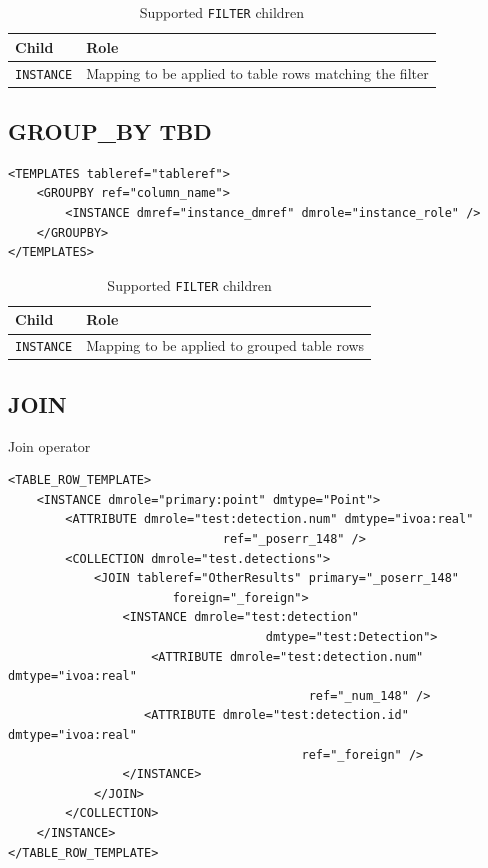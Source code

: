 \documentclass[11pt,a4paper]{ivoa}
\begin{document}
\begin{table}[!htbp]
     \begin{tabular}{|p{4cm}|p{9cm}|}
       \hline Child &  Role\\
       \hline  \texttt{INSTANCE}    & Mapping to be applied to table rows matching the filter \\       
       \hline 
     \end{tabular}
     \caption{Supported  \texttt{FILTER} children} 
     \label{tbl:filter-children}
\end{table}


\subsection{GROUP\_BY  TBD}

\begin{lstlisting}[caption={GROUP\_BY examples},captionpos=b]
<TEMPLATES tableref="tableref">
    <GROUPBY ref="column_name">
        <INSTANCE dmref="instance_dmref" dmrole="instance_role" />
    </GROUPBY>
</TEMPLATES>
\end{lstlisting}

\begin{table}[!htbp]
     \begin{tabular}{|p{4cm}|p{9cm}|}
       \hline Child &  Role\\
       \hline  \texttt{INSTANCE}    & Mapping to be applied to grouped table rows \\       
       \hline 
     \end{tabular}
     \caption{Supported  \texttt{FILTER} children} 
     \label{tbl:group-children}
\end{table}

\subsection{JOIN}
Join operator

\begin{lstlisting}[caption={JOIN example},captionpos=b]
<TABLE_ROW_TEMPLATE>
    <INSTANCE dmrole="primary:point" dmtype="Point">
        <ATTRIBUTE dmrole="test:detection.num" dmtype="ivoa:real"
                              ref="_poserr_148" />
        <COLLECTION dmrole="test.detections">
            <JOIN tableref="OtherResults" primary="_poserr_148"
                       foreign="_foreign">
                <INSTANCE dmrole="test:detection"
                                    dmtype="test:Detection">
                    <ATTRIBUTE dmrole="test:detection.num" dmtype="ivoa:real"
                                          ref="_num_148" />
                   <ATTRIBUTE dmrole="test:detection.id" dmtype="ivoa:real"
                                         ref="_foreign" />
                </INSTANCE>
            </JOIN>
        </COLLECTION>
    </INSTANCE>
</TABLE_ROW_TEMPLATE>

\end{lstlisting}
\end{document}
